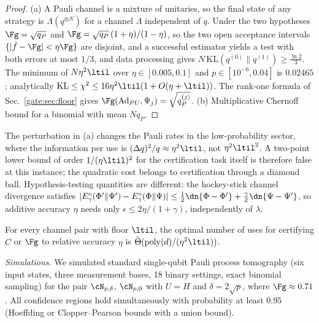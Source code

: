 \begin{proof}
(a) A Pauli channel is a mixture of unitaries, so the final state of any strategy is $\Lambda(q^{\otimes N})$ for a channel $\Lambda$ independent of $q$. Under the two hypotheses $\Fg=\sqrt{q_P}$ and $\Fg=\sqrt{q_P}\,(1+\eta)/(1-\eta)$, so the two open acceptance intervals $\{|\hat f-\Fg|<\eta\Fg\}$ are disjoint, and a successful estimator yields a test with both errors at most $1/3$, and data processing gives $N\,\mathrm{KL}(q^{(0)}\|q^{(1)})\ge\frac{\ln2}{3}$. The minimum of $N\eta^2\ltil$ over $\eta\in[0.005,0.1]$ and $p\in[10^{-6},0.04]$ is $0.02465$; analytically $\mathrm{KL}\le\chi^2\le16\eta^2\ltil(1+O(\eta+\ltil))$. The rank-one formula of Sec.~\ref{gate:sec:floor} gives $\Fg(\mathrm{Ad}_{PU},\Psi_j)=\sqrt{q_P^{(j)}}$. (b) Multiplicative Chernoff bound for a binomial with mean $Nq_P$.
\end{proof}

The perturbation in (a) changes the Pauli rates in the low-probability sector, where the information per use is $(\Delta q)^2/q\approx\eta^2\ltil$, not $\eta^2\ltil^2$. A two-point lower bound of order $1/(\eta\ltil)^2$ for the certification task itself is therefore false at this instance; the quadratic cost belongs to certification through a diamond ball. Hypothesis-testing quantities are different: the hockey-stick channel divergence satisfies $|E^\diamond_\gamma(\Phi'\|\Psi')-E^\diamond_\gamma(\Phi\|\Psi)|\le\frac12\dn{\Phi-\Phi'}+\frac\gamma2\dn{\Psi-\Psi'}$, so additive accuracy $\eta$ needs only $\epsilon\le2\eta/(1+\gamma)$, independently of $\lambda$.

\begin{conjecture}\label{gate:conj:cert}
For every channel pair with floor $\ltil$, the optimal number of uses for certifying $\hat C$ or $\Fg$ to relative accuracy $\eta$ is $\tilde\Theta(\mathrm{poly}(d)/(\eta^2\ltil))$.
\end{conjecture}

\emph{Simulations.} We simulated standard single-qubit Pauli process tomography (six input states, three measurement bases, 18 binary settings, exact binomial sampling) for the pair $\cN_{p,\delta}$, $\cN_{p,0}$ with $U=H$ and $\delta=2\sqrt p$, where $\Fg\approx0.71$. All confidence regions hold simultaneously with probability at least $0.95$ (Hoeffding or Clopper--Pearson bounds with a union bound).

